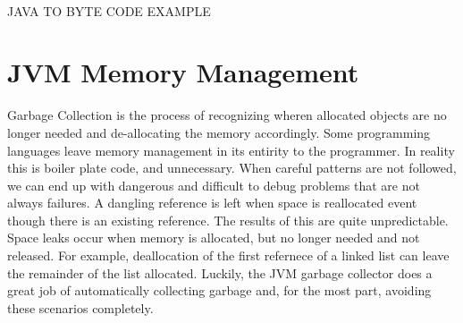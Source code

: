 \documentclass[10pt,a4paper]{article}
\begin{document}
\\ JAVA TO BYTE CODE EXAMPLE 

\section{JVM Memory Management}
Garbage Collection is the process of recognizing wheren allocated objects are no longer needed and de-allocating the memory accordingly. Some programming languages leave memory management in its entirity to the programmer. In reality this is boiler plate code, and unnecessary. When careful patterns are not followed, we can end up with dangerous and difficult to debug problems that are not always failures. 
\newlinew\newline
A dangling reference is left when space is reallocated event though there is an existing reference. The results of this are quite unpredictable. Space leaks occur when memory is allocated, but no longer needed and not released. For example, deallocation of the first refernece of a linked list can leave the remainder of the list allocated. Luckily, the JVM garbage collector does a great job of automatically collecting garbage and, for the most part, avoiding these scenarios completely. 
\end{document}
